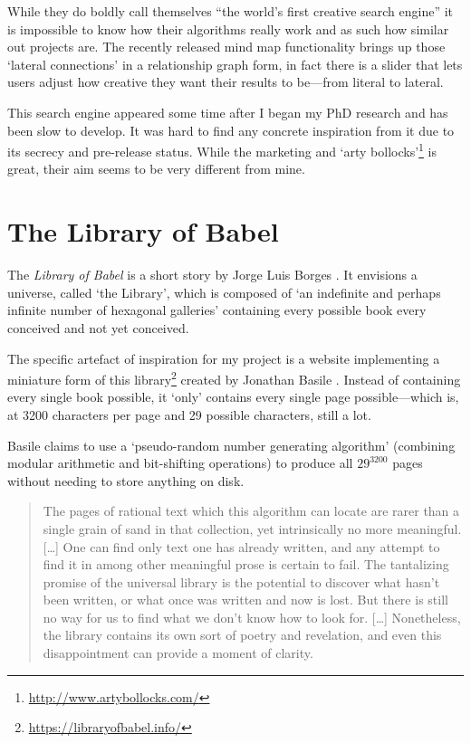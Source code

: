 While they do boldly call themselves ``the world's first creative search engine'' \autocite{Yossarian2015} it is impossible to know how their algorithms really work and as such how similar out projects are. The recently released mind map functionality brings up those `lateral connections' in a relationship graph form, in fact there is a slider that lets users adjust how creative they want their results to be---from literal to lateral.

This search engine appeared some time after I began my PhD research and has been slow to develop. It was hard to find any concrete inspiration from it due to its secrecy and pre-release status. While the marketing and `arty bollocks'\footnote{\url{http://www.artybollocks.com/}} is great, their aim seems to be very different from mine.



\section{The Library of Babel}
\label{s:babel}

The \textit{Library of Babel} is a short story by Jorge Luis Borges \citeyear{Borges1964}. It envisions a universe, called `the Library', which is composed of `an indefinite and perhaps infinite number of hexagonal galleries' containing every possible book every conceived and not yet conceived.

The specific artefact of inspiration for my project is a website implementing a miniature form of this library\footnote{\url{https://libraryofbabel.info/}} created by Jonathan Basile \citeyear{Basile2015}. Instead of containing every single book possible, it `only' contains every single page possible---which is, at \num{3200} characters per page and \num{29} possible characters, still a lot.

Basile claims to use a `pseudo-random number generating algorithm' (combining modular arithmetic and bit-shifting operations) to produce all $29^{3200}$ pages without needing to store anything on disk.

\begin{quotation}
  The pages of rational text which this algorithm can locate are rarer than a single grain of sand in that collection, yet intrinsically no more meaningful.
  [\ldots]
  One can find only text one has already written, and any attempt to find it in among other meaningful prose is certain to fail. The tantalizing promise of the universal library is the potential to discover what hasn’t been written, or what once was written and now is lost. But there is still no way for us to find what we don’t know how to look for.
  [\ldots]
  Nonetheless, the library contains its own sort of poetry and revelation, and even this disappointment can provide a moment of clarity. 
\end{quotation}

